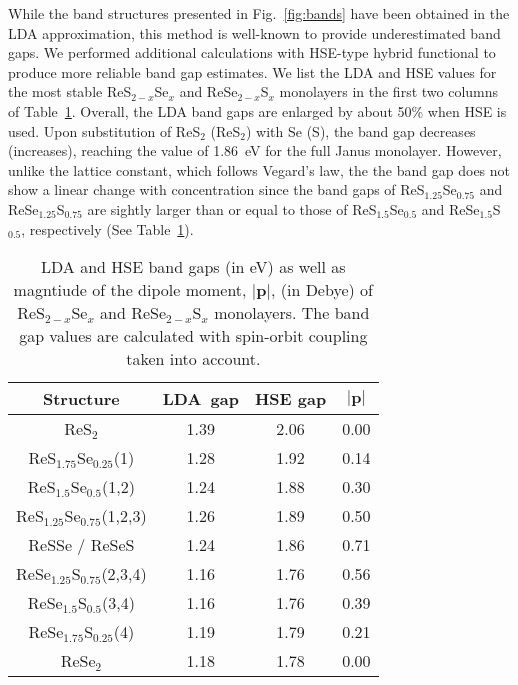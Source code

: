 \documentclass[reprint, superscriptaddress, amsmath,amssymb,prb,twocolumn]{revtex4-2}
\def\gap{HSE gap}
\def\SSex{ReS$_{2-x}$Se$_x$}
\def\SSeOne{ReS$_{1.75}$Se$_{0.25}$}
\def\SSeTwo{ReS$_{1.5}$Se$_{0.5}$}
\def\SSeThree{ReS$_{1.25}$Se$_{0.75}$}
\def\SeSx{ReSe$_{2-x}$S$_x$}
\def\SeSOne{ReSe$_{1.75}$S$_{0.25}$}
\def\SeSTwo{ReSe$_{1.5}$S$_{0.5}$}
\def\SeSThree{ReSe$_{1.25}$S$_{0.75}$}
\newcommand{\vect}[1]{\boldsymbol{#1}}	%
\begin{document}
While the band structures presented in Fig.~\ref{fig:bands} have been obtained in the LDA approximation, this method is well-known to provide underestimated band gaps. We performed additional calculations with HSE-type hybrid functional to produce more reliable band gap estimates. We list the LDA and HSE values for the most stable \SSex{} and \SeSx{} monolayers in the first two columns of Table~\ref{my-gaps}. Overall, the LDA band gaps are enlarged by about 50\% when HSE is used. Upon substitution of ReS$_{2}$ (ReS$_{2}$) with Se (S), the band gap decreases (increases), reaching the value of 1.86~eV for the full Janus monolayer. However, unlike the lattice constant, which follows Vegard's law, the the band gap does not show a linear change with concentration since the band gaps of \SSeThree{} and \SeSThree{} are sightly larger than or equal to those of \SSeTwo{} and \SeSTwo{}, respectively (See Table~\ref{my-gaps}). 

\begin{table}[!b]
\centering
\caption{LDA and HSE band gaps (in eV) as well as magntiude of the dipole moment, $|\vect{p}|$, (in Debye) of \SSex{} and \SeSx{} monolayers. The band gap values are calculated with spin-orbit coupling taken into account.}
\label{my-gaps}
\begin{tabular}{cccc}%
 Structure   & \multicolumn{1}{c}{LDA~gap} & \multicolumn{1}{c}{\gap{}} & \multicolumn{1}{c}{$|\vect{p}|$} \\
\hline
ReS$_2$      &  1.39 & 2.06 &  0.00  \\
\SSeOne{}(1)    &  1.28 & 1.92 &  0.14  \\
\SSeTwo{}(1,2)    &  1.24 & 1.88 &  0.30  \\
\SSeThree{}(1,2,3)  &  1.26 & 1.89 &  0.50  \\
ReSSe / ReSeS  &  1.24 & 1.86 &  0.71  \\
\SeSThree{}(2,3,4)  &  1.16 & 1.76 &  0.56  \\
\SeSTwo{}(3,4)    &  1.16 & 1.76 &  0.39  \\
\SeSOne{}(4)    &  1.19 & 1.79 &  0.21  \\
ReSe$_2$     &  1.18 & 1.78 &  0.00  \\
\end{tabular}
\end{table}
\end{document}
